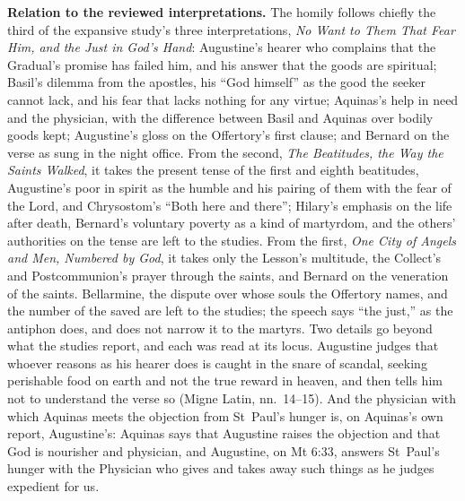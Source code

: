 {\textbf{Relation to the reviewed interpretations.} The homily follows chiefly
the third of the expansive study's three interpretations, \textit{No Want to
Them That Fear Him, and the Just in God's Hand}: Augustine's hearer who
complains that the Gradual's promise has failed him, and his answer that the
goods are spiritual; Basil's dilemma from the apostles, his ``God himself''
as the good the seeker cannot lack, and his fear that lacks nothing for any
virtue; Aquinas's help in need and the physician, with the difference between
Basil and Aquinas over bodily goods kept; Augustine's gloss on the Offertory's
first clause; and Bernard on the verse as sung in the night office. From the
second, \textit{The Beatitudes, the Way the Saints Walked}, it takes the
present tense of the first and eighth beatitudes, Augustine's poor in spirit
as the humble and his pairing of them with the fear of the Lord, and
Chrysostom's ``Both here and there''; Hilary's emphasis on the life after
death, Bernard's voluntary poverty as a kind of martyrdom, and the others'
authorities on the tense are left to the studies. From the first, \textit{One
City of Angels and Men, Numbered by God}, it takes only the Lesson's
multitude, the Collect's and Postcommunion's prayer through the saints, and
Bernard on the veneration of the saints. Bellarmine, the dispute over whose
souls the Offertory names, and the number of the saved are left to the
studies; the speech says ``the just,'' as the antiphon does, and does not
narrow it to the martyrs. Two details go beyond what the studies report, and
each was read at its locus. Augustine judges that whoever reasons as his
hearer does is caught in the snare of scandal, seeking perishable food on
earth and not the true reward in heaven, and then tells him not to
understand the verse so (Migne Latin, nn.~14--15). And the physician with
which Aquinas meets the objection from St~Paul's hunger is, on Aquinas's own
report, Augustine's: Aquinas says that Augustine raises the objection and
that God is nourisher and physician, and Augustine, on Mt 6:33, answers
St~Paul's hunger with the Physician who gives and takes away such things as he
judges expedient for us.

}
